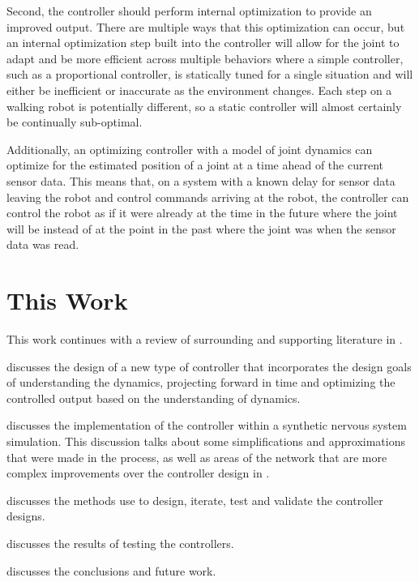 Second, the controller should perform internal optimization to provide an
improved output. There are multiple ways that this optimization can occur, but
an internal optimization step built into the controller will allow for the joint
to adapt and be more efficient across multiple behaviors where a simple
controller, such as a proportional controller, is statically tuned for a single
situation and will either be inefficient or inaccurate as the environment
changes. Each step on a walking robot is potentially different, so a static
controller will almost certainly be continually sub-optimal.

Additionally, an optimizing controller with a model of joint dynamics can
optimize for the estimated position of a joint at a time ahead of the current
sensor data. This means that, on a system with a known delay for sensor data
leaving the robot and control commands arriving at the robot, the controller can
control the robot as if it were already at the time in the future where the
joint will be instead of at the point in the past where the joint was when the
sensor data was read.

\section{This Work}

This work continues with a review of surrounding and supporting literature in
.

discusses the design of a new type 
of controller that incorporates the
design goals of understanding the dynamics, projecting forward in time and
optimizing the controlled output based on the understanding of dynamics.

 discusses the implementation of the controller within 
a synthetic nervous system
simulation. This discussion talks about some simplifications and approximations
that were made in the process, as well as areas of the network that are more
complex improvements over the controller design in .

 discusses the methods use to design, iterate, test and
validate the controller designs.

 discusses the results of testing the controllers.

 discusses the conclusions and future work.
